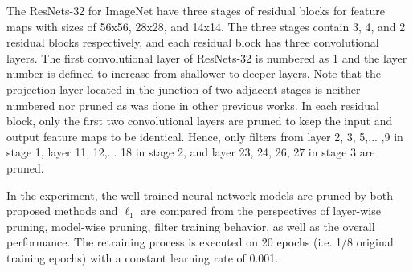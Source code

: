 \documentclass{article} %
\begin{document}
The ResNets-32 for ImageNet have three stages of residual blocks for feature maps with sizes of 56x56, 28x28, and 14x14.
	The three stages contain 3, 4, and 2 residual blocks respectively, and each residual block has three convolutional layers.
	The first convolutional layer of ResNets-32 is numbered as 1 and the layer number is defined to increase from shallower to deeper layers.
	Note that the projection layer located in the junction of two adjacent stages is neither numbered nor pruned as was done in other previous works.
	In each residual block, only the first two convolutional layers are pruned to keep the input and output feature maps to be identical.
	Hence, only filters from layer 2, 3, 5,... ,9 in stage 1, layer 11, 12,... 18 in stage 2, and layer 23, 24, 26, 27 in stage 3 are pruned. 

In the experiment, the well trained neural network models are pruned by both proposed methods and $\ell_1$ are compared from the perspectives of layer-wise pruning, model-wise pruning, filter training behavior, as well as the overall performance.
The retraining process is executed on 20 epochs (i.e. 1/8 original training epochs) with a constant learning rate of 0.001.
\end{document}
